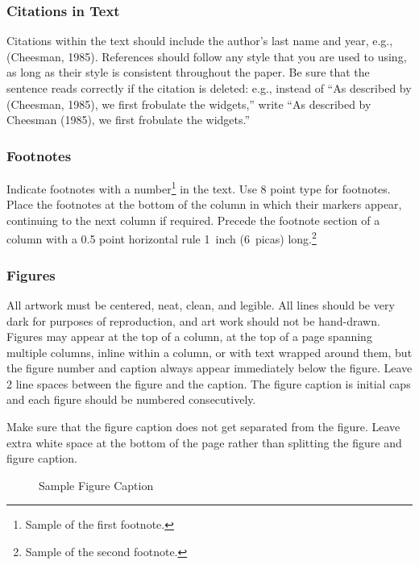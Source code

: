\documentclass[twoside]{article}
\begin{document}
\subsubsection{Citations in Text}

Citations within the text should include the author's last name and
year, e.g., (Cheesman, 1985). References should follow any style that
you are used to using, as long as their style is consistent throughout
the paper.  Be sure that the sentence reads correctly if the citation
is deleted: e.g., instead of ``As described by (Cheesman, 1985), we
first frobulate the widgets,'' write ``As described by Cheesman
(1985), we first frobulate the widgets.''  %

\subsubsection{Footnotes}

Indicate footnotes with a number\footnote{Sample of the first
  footnote.} in the text. Use 8 point type for footnotes. Place the
footnotes at the bottom of the column in which their markers appear,
continuing to the next column if required. Precede the footnote
section of a column with a 0.5 point horizontal rule 1~inch (6~picas)
long.\footnote{Sample of the second footnote.}

\subsubsection{Figures}

All artwork must be centered, neat, clean, and legible.  All lines
should be very dark for purposes of reproduction, and art work should
not be hand-drawn.  Figures may appear at the top of a column, at the
top of a page spanning multiple columns, inline within a column, or
with text wrapped around them, but the figure number and caption
always appear immediately below the figure.  Leave 2 line spaces
between the figure and the caption. The figure caption is initial caps
and each figure should be numbered consecutively.

Make sure that the figure caption does not get separated from the
figure. Leave extra white space at the bottom of the page rather than
splitting the figure and figure caption.
\begin{figure}[h]
\vspace{.3in}
\centerline{}
\vspace{.3in}
\caption{Sample Figure Caption}
\end{figure}
\end{document}

